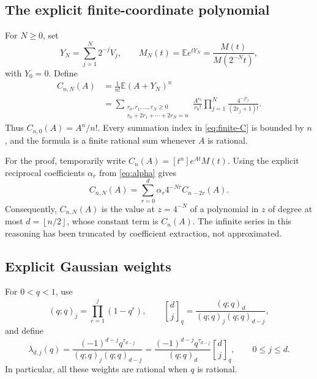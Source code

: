\documentclass[11pt,a4paper]{article}
\theoremstyle{definition}
\theoremstyle{remark}
\newcommand{\E}{\mathbb E}
\newcommand{\qbinom}[3]{\genfrac{[}{]}{0pt}{}{#1}{#2}_{#3}}
\newcommand{\coeff}[2]{[#1^{#2}]}
\newcommand{\floor}[1]{\left\lfloor #1\right\rfloor}
\begin{document}
\subsection{The explicit finite-coordinate polynomial}
For \(N\geq0\), set
\[
 Y_N=\sum_{j=1}^{N}2^{-j}V_j,\qquad
 M_N(t)=\E e^{tY_N}=\frac{M(t)}{M(2^{-N}t)},
\]
with \(Y_0=0\).  Define
\begin{equation}
 \begin{split}
 C_{n,N}(A)&=\frac1{n!}\E(A+Y_N)^n\\
 &=\sum_{\substack{r_0,r_1,\ldots,r_N\geq0\\
                    r_0+2r_1+\cdots+2r_N=n}}
       \frac{A^{r_0}}{r_0!}
       \prod_{j=1}^{N}\frac{4^{-jr_j}}{(2r_j+1)!}.
 \end{split}                                                  \label{eq:finite-C}
\end{equation}
Thus \(C_{n,0}(A)=A^n/n!\).  Every summation index in
\eqref{eq:finite-C} is bounded by \(n\), and the formula is a finite rational sum
whenever \(A\) is rational.

For the proof, temporarily write
\(C_n(A)=\coeff{t}{n}e^{At}M(t)\).  Using the explicit reciprocal coefficients
\(\alpha_r\) from \eqref{eq:alpha} gives
\begin{equation}
 C_{n,N}(A)=\sum_{r=0}^{d}\alpha_r4^{-Nr}C_{n-2r}(A).
                                                               \label{eq:C-scale}
\end{equation}
Consequently, \(C_{n,N}(A)\) is the value at \(z=4^{-N}\) of a polynomial in
\(z\) of degree at most \(d=\floor{n/2}\), whose constant term is \(C_n(A)\).
The infinite series in this reasoning has been truncated by coefficient
extraction, not approximated.

\subsection{Explicit Gaussian weights}
For \(0<q<1\), use
\[
 (q;q)_j=\prod_{r=1}^{j}(1-q^r),\qquad
 \qbinom{d}{j}{q}=\frac{(q;q)_d}{(q;q)_j(q;q)_{d-j}},
\]
and define
\begin{equation}
 \boxed{\displaystyle
 \lambda_{d,j}(q)
  =\frac{(-1)^{d-j}q^{\tau_{d-j}}}
        {(q;q)_j(q;q)_{d-j}}
  =\frac{(-1)^{d-j}q^{\tau_{d-j}}}{(q;q)_d}
       \qbinom{d}{j}{q},\qquad 0\leq j\leq d.}          \label{eq:weights}
\end{equation}
In particular, all these weights are rational when \(q\) is rational.
\end{document}

